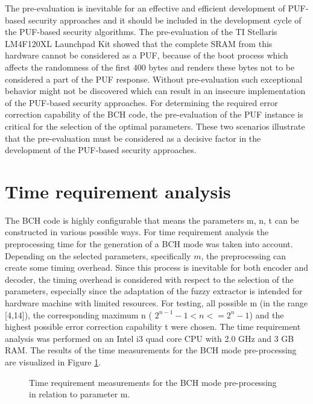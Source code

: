 The pre-evaluation is inevitable for an effective and efficient development of PUF-based security approaches and it should be included in the development cycle of the PUF-based security algorithms. The pre-evaluation of the TI Stellaris LM4F120XL Launchpad Kit showed that the complete SRAM from this hardware cannot be considered as a PUF, because of the boot process which affects the randomness of the first  $400$ bytes and renders these bytes not to be considered a part of the PUF response.
Without pre-evaluation such exceptional behavior might not be discovered which can result in an insecure implementation of the PUF-based security approaches. For determining the required error correction capability of the BCH code, the pre-evaluation of the PUF instance is critical for the selection of the optimal parameters. These two scenarios illustrate that the pre-evaluation must be considered as a decisive factor in the development of the PUF-based security approaches.


\section{Time requirement analysis}

The BCH code is highly configurable that means the parameters m, n, t can be constructed in various possible ways. For time requirement analysis the preprocessing time for the generation of a BCH mode was taken into account. Depending on the selected parameters, specifically $m$, the preprocessing can create some timing overhead. Since this process is inevitable for both encoder and decoder, the timing overhead is considered with respect to the selection of the parameters, especially since
the adaptation of the fuzzy extractor is intended for hardware machine with limited resources. For testing, all possible m (in the range [4,14]), the corresponding maximum n ( $2^{n-1} - 1 < n <= 2^{n} - 1$) and the highest possible error correction capability t were chosen. The time requirement analysis was performed on an Intel i3 quad core CPU with 2.0 GHz and 3 GB RAM. The results of the time measurements for the BCH mode pre-processing are visualized in Figure \ref{img:bch_time}.
\begin{figure}[h]
\centering
{}
\caption{Time requirement measurements for the BCH mode pre-processing in relation to parameter m.}
\label{img:bch_time}
\end{figure}


